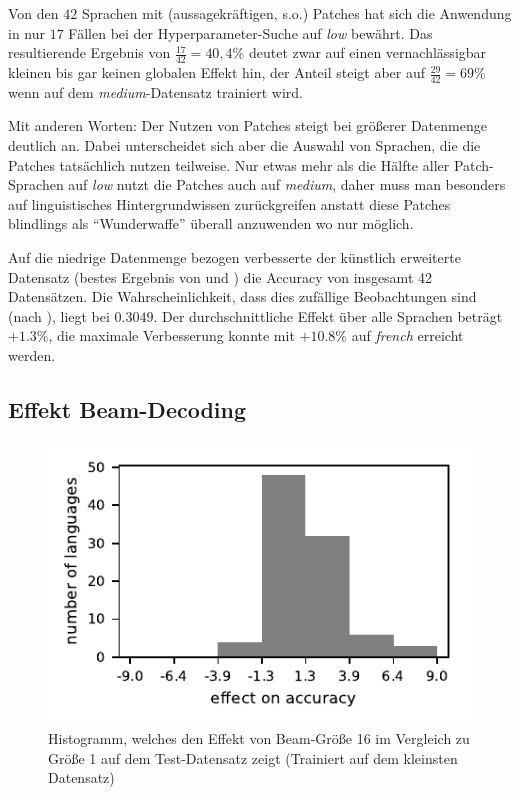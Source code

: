 \documentclass[11pt,a4paper]{article}
\newcommand{\lang}[1]{\textit{#1}}
\begin{document}
Von den $42$ Sprachen mit (aussagekräftigen, s.o.) Patches hat sich die Anwendung in nur $17$ Fällen bei der Hyperparameter-Suche auf \textit{low} bewährt. Das resultierende Ergebnis von $\frac{17}{42} = 40,4\%$ deutet zwar auf einen vernachlässigbar kleinen bis gar keinen globalen Effekt hin, der Anteil steigt aber auf $\frac{29}{42} = 69\%$ wenn auf dem \textit{medium}-Datensatz trainiert wird.

Mit anderen Worten: Der Nutzen von Patches steigt bei größerer Datenmenge deutlich an. Dabei unterscheidet sich aber die Auswahl von Sprachen, die die Patches tatsächlich nutzen teilweise. Nur etwas mehr als die Hälfte aller Patch-Sprachen auf \textit{low} nutzt die Patches auch auf \textit{medium}, daher muss man besonders auf linguistisches Hintergrundwissen zurückgreifen anstatt diese Patches blindlings als \enquote{Wunderwaffe} überall anzuwenden wo nur möglich.

Auf die niedrige Datenmenge bezogen verbesserte der künstlich erweiterte Datensatz (bestes Ergebnis von  und ) die Accuracy von insgesamt 42 Datensätzen. Die Wahrscheinlichkeit, dass dies zufällige Beobachtungen sind (nach \citet{biostat:zar}), liegt bei $0.3049$. Der durchschnittliche Effekt über alle Sprachen beträgt $+1.3\%$, die maximale Verbesserung konnte mit $+10.8\%$ auf \lang{french} erreicht werden.

\subsection{Effekt Beam-Decoding}
\label{sec:beam-results}

\begin{figure}
\centering
\includegraphics[width=\linewidth]{beamlow}
\caption{Histogramm, welches den Effekt von Beam-Größe 16 im Vergleich zu Größe 1 auf dem Test-Datensatz zeigt (Trainiert auf dem kleinsten Datensatz)}
\label{fig:histBeamLowAcc}
\end{figure}
\end{document}
